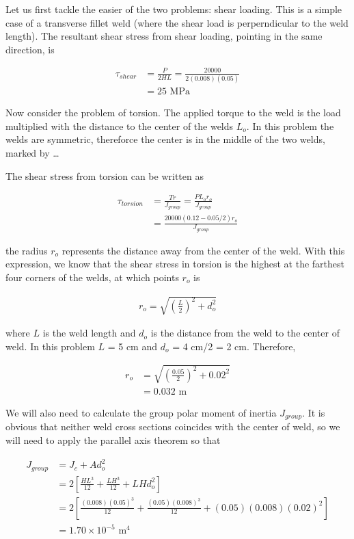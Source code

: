 \documentclass[a4paper,openany,nobib]{tufte-book}
\begin{document}
{{Let us first tackle the easier of the two problems: shear loading. This
is a simple case of a transverse fillet weld (where the shear load is
perperndicular to the weld length). The resultant shear stress from
shear loading, pointing in the same direction, is

$$\begin{aligned}
    \tau_{shear} &= \frac{P}{2HL} = \frac{20000}{2(0.008)(0.05)} \\
                 &= 25 \text{ MPa}
  \end{aligned}$$

Now consider the problem of torsion. The applied torque to the weld is
the load multiplied with the distance to the center of the welds \(L_o\).
In this problem the welds are symmetric, thereforce the center is in the
middle of the two welds, marked by \ldots{}

The shear stress from torsion can be written as

$$\begin{aligned}
    \tau_{torsion} &= \frac{Tr}{J_{group}} = \frac{P L_o r_o}{J_{group}} \\
                   &= \frac{20000(0.12-0.05/2) r_o}{J_{group}}
  \end{aligned}$$

the radius \(r_o\) represents the distance away from the center of the
weld. With this expression, we know that the shear stress in torsion is
the highest at the farthest four corners of the welds, at which points
\(r_o\) is

$$\begin{aligned}
    r_o = \sqrt{ \left( \frac{L}{2} \right)^2 + d_o^2 }
  \end{aligned}$$

where \(L\) is the weld length and \(d_o\) is the distance from the weld to
the center of weld. In this problem \(L\) = 5 cm and \(d_o\) = 4 cm/2 = 2
cm. Therefore,

$$\begin{aligned}
     r_o &= \sqrt{ \left( \frac{0.05}{2} \right)^2 + 0.02^2 } \\
         &= 0.032 \text{ m}
   \end{aligned}$$

We will also need to calculate the group polar moment of inertia
\(J_{group}\). It is obvious that neither weld cross sections coincides
with the center of weld, so we will need to apply the parallel axis
theorem so that

$$\begin{aligned}
     J_{group} &= J_c + A d_o^2 \\
               &= 2 \left[ \frac{HL^3}{12} +\frac{LH^3}{12} + LHd_o^2 \right] \\
               &= 2 \left[ \frac{(0.008)(0.05)^3}{12} + \frac{(0.05)(0.008)^3}{12} + (0.05)(0.008)(0.02)^2 \right] \\
               &= 1.70 \times 10^{-5} \text{ m}^4
   \end{aligned}$$

}}
\end{document}
